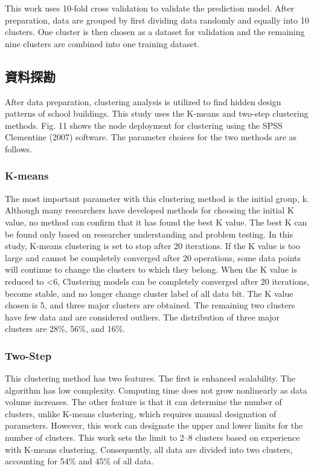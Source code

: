 This work uses 10-fold cross validation to validate the prediction model. After preparation, data are grouped by first dividing data randomly and equally into 10 clusters. One cluster is then chosen as a dataset for validation and the remaining nine clusters are combined into one training dataset.

\subsection{資料探勘}

After data preparation, clustering analysis is utilized to find hidden design patterns of school buildings. This study uses the K-means and two-step clustering methods. Fig. 11 shows the node deployment for clustering using the SPSS Clementine (2007) software. The parameter choices for the two methods are as follows.

\subsubsection{K-means}

The most important parameter with this clustering method is the initial group, k. Although many researchers have developed methods for choosing the initial K value, no method can confirm that it has found the best K value. The best K can be found only based on researcher understanding and problem testing. In this study, K-means clustering is set to stop after 20 iterations. If the K value is too large and cannot be completely converged after 20 operations, some data points will continue to change the clusters to which they belong. When the K value is reduced to <6, Clustering models can be completely converged after 20 iterations, become stable, and no longer change cluster label of all data bit. The K value chosen is 5, and three major clusters are obtained. The remaining two clusters have few data and are considered outliers. The distribution of three major clusters are 28\%, 56\%, and 16\%.

\subsubsection{Two-Step}

This clustering method has two features. The first is enhanced scalability. The algorithm has low complexity. Computing time does not grow nonlinearly as data volume increases. The other feature is that it can determine the number of clusters, unlike K-means clustering, which requires manual designation of parameters. However, this work can designate the upper and lower limits for the number of clusters. This work sets the limit to 2–8 clusters based on experience with K-means clustering. Consequently, all data are divided into two clusters, accounting for 54\% and 45\% of all data.

